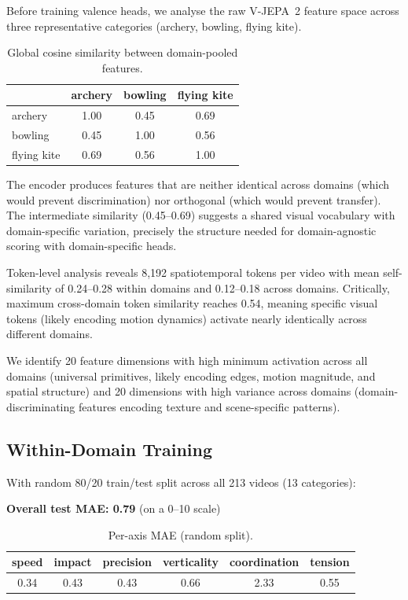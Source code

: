 \documentclass[11pt]{article}
\begin{document}
Before training valence heads, we analyse the raw V-JEPA~2 feature space across three representative categories (archery, bowling, flying kite).

\begin{table}[h]
\centering
\caption{Global cosine similarity between domain-pooled features.}
\label{tab:cosine}
\begin{tabular}{lccc}
\toprule
 & \textbf{archery} & \textbf{bowling} & \textbf{flying kite} \\
\midrule
archery & 1.00 & 0.45 & 0.69 \\
bowling & 0.45 & 1.00 & 0.56 \\
flying kite & 0.69 & 0.56 & 1.00 \\
\bottomrule
\end{tabular}
\end{table}

The encoder produces features that are neither identical across domains (which would prevent discrimination) nor orthogonal (which would prevent transfer). The intermediate similarity (0.45--0.69) suggests a shared visual vocabulary with domain-specific variation, precisely the structure needed for domain-agnostic scoring with domain-specific heads.

Token-level analysis reveals 8{,}192 spatiotemporal tokens per video with mean self-similarity of 0.24--0.28 within domains and 0.12--0.18 across domains. Critically, maximum cross-domain token similarity reaches 0.54, meaning specific visual tokens (likely encoding motion dynamics) activate nearly identically across different domains.

We identify 20 feature dimensions with high minimum activation across all domains (universal primitives, likely encoding edges, motion magnitude, and spatial structure) and 20 dimensions with high variance across domains (domain-discriminating features encoding texture and scene-specific patterns).

\subsection{Within-Domain Training}

With random 80/20 train/test split across all 213 videos (13 categories):

\textbf{Overall test MAE: 0.79} (on a 0--10 scale)

\begin{table}[h]
\centering
\caption{Per-axis MAE (random split).}
\label{tab:peraxis}
\begin{tabular}{cccccc}
\toprule
\textbf{speed} & \textbf{impact} & \textbf{precision} & \textbf{verticality} & \textbf{coordination} & \textbf{tension} \\
\midrule
0.34 & 0.43 & 0.43 & 0.66 & 2.33 & 0.55 \\
\bottomrule
\end{tabular}
\end{table}
\end{document}
